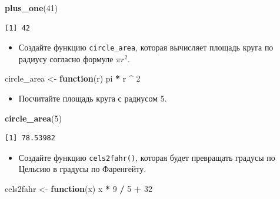 \documentclass[
]{book}
\newenvironment{Shaded}{\begin{snugshade}}{\end{snugshade}}
\newcommand{\ControlFlowTok}[1]{\textcolor[rgb]{0.13,0.29,0.53}{\textbf{#1}}}
\newcommand{\DecValTok}[1]{\textcolor[rgb]{0.00,0.00,0.81}{#1}}
\newcommand{\KeywordTok}[1]{\textcolor[rgb]{0.13,0.29,0.53}{\textbf{#1}}}
\newcommand{\NormalTok}[1]{#1}
\newcommand{\OperatorTok}[1]{\textcolor[rgb]{0.81,0.36,0.00}{\textbf{#1}}}
\newcommand{\StringTok}[1]{\textcolor[rgb]{0.31,0.60,0.02}{#1}}
\providecommand{\tightlist}{%
  \setlength{\itemsep}{0pt}\setlength{\parskip}{0pt}}
\begin{document}
\begin{Shaded}
\begin{Highlighting}[]
\KeywordTok{plus_one}\NormalTok{(}\DecValTok{41}\NormalTok{)}
\end{Highlighting}
\end{Shaded}

\begin{verbatim}
[1] 42
\end{verbatim}

\begin{itemize}
\tightlist
\item
  Создайте функцию \texttt{circle\_area}, которая вычисляет площадь круга по радиусу согласно формуле \(\pi r^2\).
\end{itemize}

\begin{Shaded}
\begin{Highlighting}[]
\NormalTok{circle_area <-}\StringTok{ }\ControlFlowTok{function}\NormalTok{(r) pi }\OperatorTok{*}\StringTok{ }\NormalTok{r }\OperatorTok{^}\StringTok{ }\DecValTok{2}
\end{Highlighting}
\end{Shaded}

\begin{itemize}
\tightlist
\item
  Посчитайте площадь круга с радиусом 5.
\end{itemize}

\begin{Shaded}
\begin{Highlighting}[]
\KeywordTok{circle_area}\NormalTok{(}\DecValTok{5}\NormalTok{)}
\end{Highlighting}
\end{Shaded}

\begin{verbatim}
[1] 78.53982
\end{verbatim}

\begin{itemize}
\tightlist
\item
  Создайте функцию \texttt{cels2fahr()}, которая будет превращать градусы по Цельсию в градусы по Фаренгейту.
\end{itemize}

\begin{Shaded}
\begin{Highlighting}[]
\NormalTok{cels2fahr <-}\StringTok{ }\ControlFlowTok{function}\NormalTok{(x) x }\OperatorTok{*}\StringTok{ }\DecValTok{9} \OperatorTok{/}\StringTok{ }\DecValTok{5} \OperatorTok{+}\StringTok{ }\DecValTok{32}
\end{Highlighting}
\end{Shaded}
\end{document}
